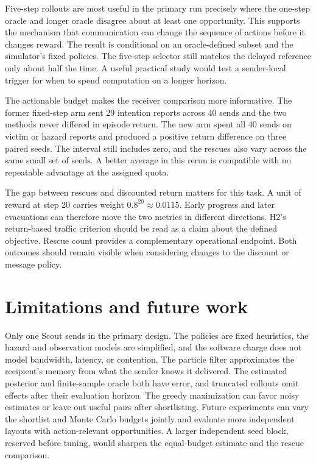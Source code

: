 \documentclass{article}
\begin{document}
Five-step rollouts are most useful in the primary run precisely where the one-step oracle and longer oracle disagree about at least one opportunity. This supports the mechanism that communication can change the sequence of actions before it changes reward. The result is conditional on an oracle-defined subset and the simulator's fixed policies. The five-step selector still matches the delayed reference only about half the time. A useful practical study would test a sender-local trigger for when to spend computation on a longer horizon.

The actionable budget makes the receiver comparison more informative. The former fixed-step arm sent 29 intention reports across 40 sends and the two methods never differed in episode return. The new arm spent all 40 sends on victim or hazard reports and produced a positive return difference on three paired seeds. The interval still includes zero, and the rescues also vary across the same small set of seeds. A better average in this rerun is compatible with no repeatable advantage at the assigned quota.

The gap between rescues and discounted return matters for this task. A unit of reward at step 20 carries weight $0.8^{20}\approx 0.0115$. Early progress and later evacuations can therefore move the two metrics in different directions. H2's return-based traffic criterion should be read as a claim about the defined objective. Rescue count provides a complementary operational endpoint. Both outcomes should remain visible when considering changes to the discount or message policy.

\section{Limitations and future work}

Only one Scout sends in the primary design. The policies are fixed heuristics, the hazard and observation models are simplified, and the software charge does not model bandwidth, latency, or contention. The particle filter approximates the recipient's memory from what the sender knows it delivered. The estimated posterior and finite-sample oracle both have error, and truncated rollouts omit effects after their evaluation horizon. The greedy maximization can favor noisy estimates or leave out useful pairs after shortlisting. Future experiments can vary the shortlist and Monte Carlo budgets jointly and evaluate more independent layouts with action-relevant opportunities. A larger independent seed block, reserved before tuning, would sharpen the equal-budget estimate and the rescue comparison.
\end{document}
